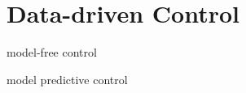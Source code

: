 \section{Data-driven Control} 
\label{sec:experiments:mpc}

model-free control

model predictive control
